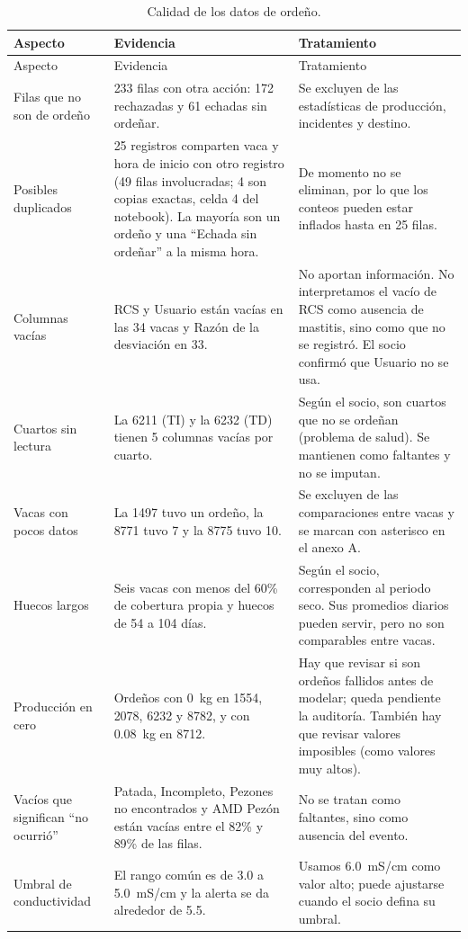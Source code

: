 \documentclass[11pt,letterpaper,DIV=12]{scrartcl}
\begin{document}
\begin{small}
\begin{longtable}{L{3.2cm}L{5.6cm}L{6.2cm}}
\caption{Calidad de los datos de ordeño.}\\
\toprule
Aspecto & Evidencia & Tratamiento \\
\midrule
\endfirsthead
\toprule
Aspecto & Evidencia & Tratamiento \\
\midrule
\endhead
\bottomrule
\endfoot
Filas que no son de ordeño & 233 filas con otra acción: 172 rechazadas y 61 echadas sin ordeñar. & Se excluyen de las estadísticas de producción, incidentes y destino. \\
Posibles duplicados & 25 registros comparten vaca y hora de inicio con otro registro (49 filas involucradas; 4 son copias exactas, celda 4 del notebook). La mayoría son un ordeño y una ``Echada sin ordeñar'' a la misma hora. & De momento no se eliminan, por lo que los conteos pueden estar inflados hasta en 25 filas. \\
Columnas vacías & RCS y Usuario están vacías en las 34 vacas y Razón de la desviación en 33. & No aportan información. No interpretamos el vacío de RCS como ausencia de mastitis, sino como que no se registró. El socio confirmó que Usuario no se usa. \\
Cuartos sin lectura & La 6211 (TI) y la 6232 (TD) tienen 5 columnas vacías por cuarto. & Según el socio, son cuartos que no se ordeñan (problema de salud). Se mantienen como faltantes y no se imputan. \\
Vacas con pocos datos & La 1497 tuvo un ordeño, la 8771 tuvo 7 y la 8775 tuvo 10. & Se excluyen de las comparaciones entre vacas y se marcan con asterisco en el anexo A. \\
Huecos largos & Seis vacas con menos del 60\% de cobertura propia y huecos de 54 a 104 días. & Según el socio, corresponden al periodo seco. Sus promedios diarios pueden servir, pero no son comparables entre vacas. \\
Producción en cero & Ordeños con 0~kg en 1554, 2078, 6232 y 8782, y con 0.08~kg en 8712. & Hay que revisar si son ordeños fallidos antes de modelar; queda pendiente la auditoría. También hay que revisar valores imposibles (como valores muy altos). \\
Vacíos que significan ``no ocurrió'' & Patada, Incompleto, Pezones no encontrados y AMD Pezón están vacías entre el 82\% y 89\% de las filas. & No se tratan como faltantes, sino como ausencia del evento. \\
Umbral de conductividad & El rango común es de 3.0 a 5.0~mS/cm y la alerta se da alrededor de 5.5.  & Usamos 6.0~mS/cm como valor alto; puede ajustarse cuando el socio defina su umbral. \\
\end{longtable}
\end{small}
\end{document}
